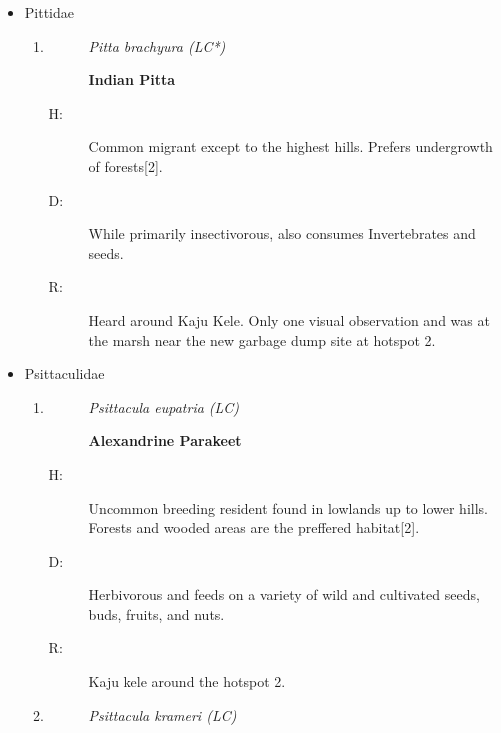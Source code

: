 \begin{itemize}
\begin{enumerate}
\begin{description}
\item[D: ]%
Primary diet consists of larvae and pupae of ants. Consumes invertebrates such as spiders, caterpillars, weevils, and beetles.%
\item[R: ]%
Kaju kele,Boat yard, wooded areas around the steel building, and Lagaan.%
\end{description}%
\end{enumerate}%
\item%
Pittidae%
\begin{enumerate}%
\item%
\begin{description}%
\item[]%
\textit{Pitta brachyura (LC*)}%
\item[]%
\textbf{Indian Pitta}%
\end{description}%
\begin{description}%
\item[H: ]%
Common migrant except to the highest hills. Prefers undergrowth of forests{[}2{]}.%
\item[D: ]%
While primarily insectivorous, also consumes Invertebrates and seeds.%
\item[R: ]%
Heard around Kaju Kele. Only one visual observation and was at the marsh near the new garbage dump site at hotspot 2.%
\end{description}%
\end{enumerate}%
\item%
Psittaculidae%
\begin{enumerate}%
\item%
\begin{description}%
\item[]%
\textit{Psittacula eupatria (LC)}%
\item[]%
\textbf{Alexandrine Parakeet}%
\end{description}%
\begin{description}%
\item[H: ]%
Uncommon breeding resident found in lowlands up to lower hills. Forests and wooded areas are the preffered habitat{[}2{]}.%
\item[D: ]%
Herbivorous and feeds on a variety of wild and cultivated seeds, buds, fruits, and nuts.%
\item[R: ]%
Kaju kele around the hotspot 2.%
\end{description}%
\item%
\begin{description}%
\item[]%
\textit{Psittacula krameri (LC)}%

\end{description}
\end{enumerate}
\end{itemize}
